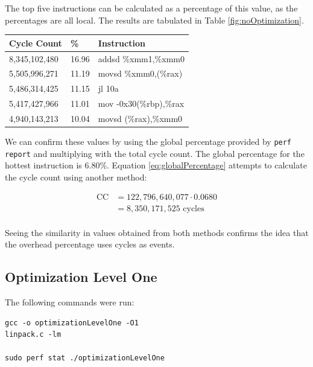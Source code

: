 \documentclass[twocolumn]{article}
\newcommand{\cc}[1]{\texttt{#1}}
\begin{document}
The top five instructions can be calculated as a percentage of this value, as the percentages are all local. The results are tabulated in Table \ref{fig:noOptimization}.\\

\begingroup
    \medskip
    \centering
    \def\arraystretch{1.5}
        \scriptsize{
        \begin{tabular}{lll}
            \toprule
            Cycle Count & \% & Instruction\\
            \midrule
            8,345,102,480 & 16.96 & addsd  \%xmm1,\%xmm0 \\
            5,505,996,271 & 11.19 & movsd  \%xmm0,(\%rax) \\
            5,486,314,425 & 11.15 & jl 10a \\
            5,417,427,966 & 11.01 & mov -0x30(\%rbp),\%rax \\
            4,940,143,213 & 10.04 & movsd  (\%rax),\%xmm0 \\
            \bottomrule
        \end{tabular}
        }
    \label{fig:noOptimization}
    \medskip
\endgroup


We can confirm these values by using the global percentage provided by \cc{perf report} and multiplying with the total cycle count. The global percentage for the hottest instruction is 6.80\%. Equation \ref{eq:globalPercentage} attempts to calculate the cycle count using another method:

\begin{equation}
    \begin{split}
        \text{CC} & = 122,796,640,077 \cdot 0.0680  \\ 
        & = 8,350,171,525 \text{ cycles}\\
    \end{split}
    \label{eq:globalPercentage}
\end{equation}

Seeing the similarity in values obtained from both methods confirms the idea  that the overhead percentage uses cycles as events. 

\subsection{Optimization Level One}

The following commands were run: 
\begin{verbatim}
gcc -o optimizationLevelOne -O1 
linpack.c -lm

sudo perf stat ./optimizationLevelOne 
\end{verbatim}
\end{document}
